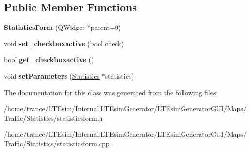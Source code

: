 \subsection*{Public Member Functions}
\begin{DoxyCompactItemize}
\item 
{\bfseries Statistics\+Form} (Q\+Widget $\ast$parent=0)\hypertarget{class_statistics_form_a08e9c8566690159a18058a18fce8a0b6}{}\label{class_statistics_form_a08e9c8566690159a18058a18fce8a0b6}

\item 
void {\bfseries set\+\_\+checkboxactive} (bool check)\hypertarget{class_statistics_form_af617e8a2c76b05aa7e8025c18f19c404}{}\label{class_statistics_form_af617e8a2c76b05aa7e8025c18f19c404}

\item 
bool {\bfseries get\+\_\+checkboxactive} ()\hypertarget{class_statistics_form_ae71b9f662f21694fe3f9bac120aa6fd2}{}\label{class_statistics_form_ae71b9f662f21694fe3f9bac120aa6fd2}

\item 
void {\bfseries set\+Parameters} (\hyperlink{class_statistics}{Statistics} $\ast$statistics)\hypertarget{class_statistics_form_a2af56adba4fdebb2c75f5682bc177a17}{}\label{class_statistics_form_a2af56adba4fdebb2c75f5682bc177a17}

\end{DoxyCompactItemize}


The documentation for this class was generated from the following files\+:\begin{DoxyCompactItemize}
\item 
/home/trance/\+L\+T\+Esim/\+Internal.\+L\+T\+Esim\+Generator/\+L\+T\+Esim\+Generator\+G\+U\+I/\+Maps/\+Traffic/\+Statistics/statisticsform.\+h\item 
/home/trance/\+L\+T\+Esim/\+Internal.\+L\+T\+Esim\+Generator/\+L\+T\+Esim\+Generator\+G\+U\+I/\+Maps/\+Traffic/\+Statistics/statisticsform.\+cpp\end{DoxyCompactItemize}
